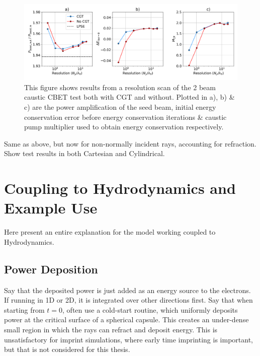\begin{figure}[t!]
    \includegraphics[width=1.0\linewidth]{Numerics/Images/caustic_cbet_test_resscan.png}
    \centering
    \caption{This figure shows results from a resolution scan of the 2 beam caustic \ac{CBET} test both with \ac{CGT} and without.
    Plotted in a), b) \& c) are the power amplification of the seed beam, initial energy conservation error before energy conservation iterations \& caustic pump multiplier used to obtain energy conservation respectively.}%
    \label{fig:SOLAS_CBET_test_caustics_resscan}
\end{figure}

Same as above, but now for non-normally incident rays, accounting for refraction.
Show test results in both Cartesian and Cylindrical.


\section{Coupling to Hydrodynamics and Example Use}

Here present an entire explanation for the model working coupled to Hydrodynamics.

\subsection{Power Deposition}

Say that the deposited power is just added as an energy source to the electrons.
If running in 1D or 2D, it is integrated over other directions first.
Say that when starting from $t=0$, often use a cold-start routine, which uniformly deposits power at the critical surface of a spherical capsule.
This creates an under-dense small region in which the rays can refract and deposit energy.
This is unsatisfactory for imprint simulations, where early time imprinting is important, but that is not considered for this thesis.

